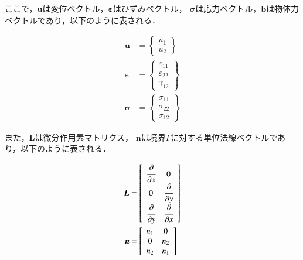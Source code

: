 \noindent
ここで，$\boldsymbol{u}$は変位ベクトル，$\boldsymbol{\varepsilon}$はひずみベクトル，
$\boldsymbol{\sigma}$は応力ベクトル，$\boldsymbol{b}$は物体力ベクトルであり，以下のように表される．

\begin{align}
  \boldsymbol{u} &= \left\{
  \begin{array}{c}
    u_1\\
    u_2
  \end{array}
  \right\}\\
  \boldsymbol{\varepsilon} &= \left\{
  \begin{array}{c}
    \varepsilon_{11}\\
    \varepsilon_{22}\\
    \gamma_{12}
  \end{array}
  \right\}\\
  \boldsymbol{\sigma} &= \left\{
  \begin{array}{c}
    \sigma_{11}\\
    \sigma_{22}\\
    \sigma_{12}
  \end{array}
  \right\}
\end{align}

\noindent
また，$\boldsymbol{L}$は微分作用素マトリクス，
$\boldsymbol{n}$は境界$\Gamma$に対する単位法線ベクトルであり，以下のように表される．

\begin{align}
  \label{eq:L}
  \boldsymbol{L} &= \left[
  \begin{array}{ccc}
    \cfrac{\partial}{\partial x} & 0\\
    0 & \cfrac{\partial}{\partial y}\\
    \cfrac{\partial}{\partial y} & \cfrac{\partial}{\partial x}
  \end{array}
  \right]\\
  \boldsymbol{n} &= \left[
    \begin{array}{ccc}
      n_1 & 0\\
      0 & n_2\\
      n_2 & n_1
    \end{array}
  \right]
\end{align}

\newpage

